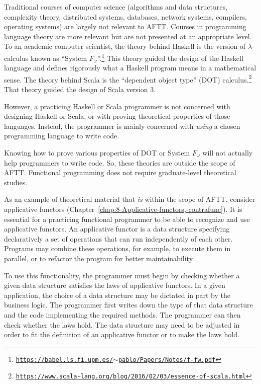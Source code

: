 Traditional courses of computer science (algorithms and data structures,
complexity theory, distributed systems, databases, network systems,
compilers, operating systems) are largely not relevant to AFTT. Courses
in programming language theory are more relevant but are not presented
at an appropriate level. To an academic computer scientist, the theory
behind Haskell is the version of $\lambda$-calculus known as
\textsf{``}System $F_{\omega}$\textsf{''}.\footnote{\texttt{\href{https://babel.ls.fi.upm.es/~pablo/Papers/Notes/f-fw.pdf}{https://babel.ls.fi.upm.es/$\sim$pablo/Papers/Notes/f-fw.pdf}}}
This theory guided the design of the Haskell language and defines
rigorously what a Haskell program means in a mathematical sense. The
theory behind Scala is the \textsf{``}dependent object type\textsf{''} (DOT) calculus.\footnote{\texttt{\href{https://www.scala-lang.org/blog/2016/02/03/essence-of-scala.html}{https://www.scala-lang.org/blog/2016/02/03/essence-of-scala.html}}}
That theory guided the design of Scala version 3.

However, a practicing Haskell or Scala programmer is not concerned
with designing Haskell or Scala, or with proving theoretical properties
of those languages. Instead, the programmer is mainly concerned with
\emph{using} a chosen programming language to write code. 

Knowing how to prove various properties of DOT or System $F_{\omega}$
will not actually help programmers to write code. So, these theories
are outside the scope of AFTT. Functional programming does not require
graduate-level theoretical studies.

As an example of theoretical material that \emph{is} within the scope
of AFTT, consider applicative functors (Chapter~\ref{chap:8-Applicative-functors,-contrafunc}).
It is essential for a practicing functional programmer to be able
to recognize and use applicative functors. An applicative functor
is a data structure specifying declaratively a set of operations that
can run independently of each other. Programs may combine these operations,
for example, to execute them in parallel, or to refactor the program
for better maintainability.

To use this functionality, the programmer must begin by checking whether
a given data structure satisfies the laws of applicative functors.
In a given application, the choice of a data structure may be dictated
in part by the business logic. The programmer first writes down the
type of that data structure and the code implementing the required
methods. The programmer can then check whether the laws hold. The
data structure may need to be adjusted in order to fit the definition
of an applicative functor or to make the laws hold.

